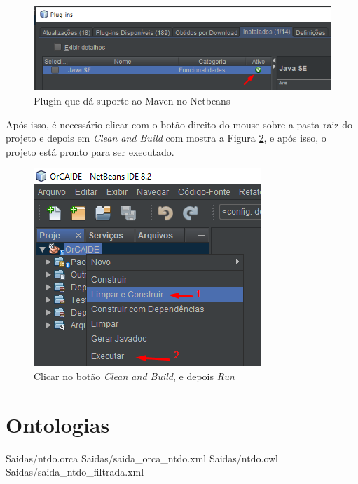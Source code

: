 \documentclass{bcc}
\begin{document}
\begin{figure}[H]
\centering
\includegraphics[width=.9\textwidth]{Figuras/install5.png}
\caption{Plugin que dá suporte ao Maven no Netbeans} 
\label{fig:install5}
\end{figure}

Após isso, é necessário clicar com o botão direito do mouse sobre a pasta raiz do projeto e depois em \textit{Clean and Build} com mostra a Figura \ref{fig:install6}, e após isso, o projeto está pronto para ser executado.

\begin{figure}[H]
\centering
\includegraphics[width=.6\textwidth]{Figuras/install6.png}
\caption{Clicar no botão \textit{Clean and Build}, e depois \textit{Run}} 
\label{fig:install6}
\end{figure}

\chapter{Ontologias} 
\label{chap:apOntologia}
 {Saidas/ntdo.orca}
 {Saidas/saida_orca_ntdo.xml}
 {Saidas/ntdo.owl}
 {Saidas/saida_ntdo_filtrada.xml}
\end{document}
